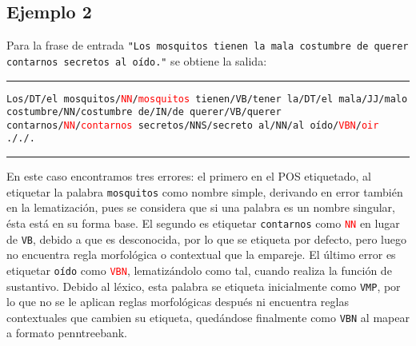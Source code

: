 \subsection*{Ejemplo 2}
Para la frase de entrada \texttt{"Los mosquitos tienen la mala costumbre de querer contarnos secretos al oído."} se obtiene la salida: \newline
\noindent\rule{14cm}{0.4pt}\newline
\texttt{Los/DT/el\newline
mosquitos/\textcolor{red}{NN}/\textcolor{red}{mosquitos}\newline
tienen/VB/tener\newline
la/DT/el\newline
mala/JJ/malo\newline
costumbre/NN/costumbre\newline
de/IN/de\newline
querer/VB/querer\newline
contarnos/\textcolor{red}{NN}/\textcolor{red}{contarnos}\newline
secretos/NNS/secreto\newline
al/NN/al\newline
oído/\textcolor{red}{VBN}/\textcolor{red}{oir}\newline
././.\newline
}
\noindent\rule{14cm}{0.4pt}\newline
En este caso encontramos tres errores: el primero en el POS etiquetado, al etiquetar la palabra \texttt{mosquitos} como nombre simple, derivando en error también en la lematización, pues se considera que si una palabra es un nombre singular, ésta está en su forma base. El segundo es etiquetar \texttt{contarnos} como \texttt{\textcolor{red}{NN}} en lugar de \texttt{VB}, debido a que es desconocida, por lo que se etiqueta por defecto, pero luego no encuentra regla morfológica o contextual que la empareje. El último error es etiquetar \texttt{oído} como \texttt{\textcolor{red}{VBN}}, lematizándolo como tal, cuando realiza la función de sustantivo. Debido al léxico, esta palabra se etiqueta inicialmente como \texttt{VMP}, por lo que no se le aplican reglas morfológicas \newline después ni encuentra reglas contextuales que cambien su etiqueta, quedándose finalmente como \texttt{VBN} al mapear a formato penntreebank. 
